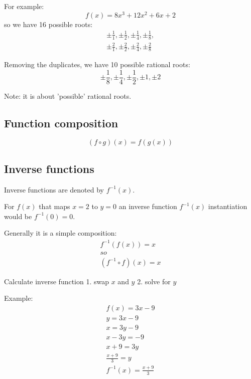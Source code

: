 \documentclass{article}
\begin{document}
For example:
\begin{equation}
  f(x) = 8x^3 + 12x^2 + 6x + 2
\end{equation}
so we have 16 possible roots:
\begin{equation}
  \begin{gathered}
    \pm \frac{1}{1}, \pm \frac{1}{2}, \pm \frac{1}{4}, \pm \frac{1}{8}, \\
    \pm \frac{2}{1}, \pm \frac{2}{2}, \pm \frac{2}{4}, \pm \frac{2}{8}
  \end{gathered}
\end{equation}

Removing the duplicates, we have 10 possible rational roots:
\begin{equation}
  \pm \frac{1}{8}, \pm \frac{1}{4}, \pm \frac{1}{2}, \pm 1, \pm 2
\end{equation}

Note: it is about 'possible' rational roots.

\subsection{Function composition}
\begin{equation}
  (f \circ g)(x) = f(g(x))
\end{equation}
\subsection{Inverse functions}
Inverse functions are denoted by $f^{-1}(x)$.

For $f(x)$ that maps $x=2$ to $y=0$ an inverse function $f^{-1}(x)$ instantiation would be
$f^{-1}(0)=0$.

Generally it is a simple composition:
\begin{equation}
  \begin{gathered}
    f^{-1}(f(x)) = x \\
    so \\
    (f^{-1} \circ f)(x) = x
  \end{gathered}
\end{equation}

Calculate inverse function
1. swap $x$ and $y$
2. solve for $y$

Example:
\begin{equation}
  \begin{gathered}
    f(x) = 3x-9 \\
    y = 3x-9 \\
    x = 3y-9 \\
    x-3y=-9 \\
    x+9=3y \\
    \frac{x+9}{3}=y \\
    f^{-1}(x)=\frac{x+9}{3}
  \end{gathered}
\end{equation}
\end{document}
